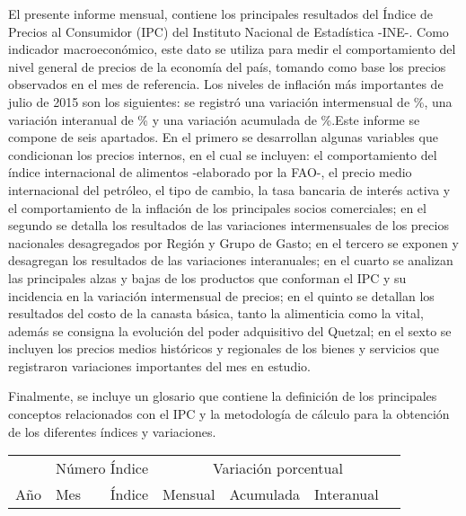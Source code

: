$\ $\\[0.5cm]
\large$\ $\\
El presente informe mensual, contiene los principales resultados del Índice de Precios al Consumidor (IPC) del Instituto Nacional de Estadística -INE-.  Como indicador macroeconómico, este dato se utiliza para medir el comportamiento del nivel general de precios de la economía del país, tomando como base los precios observados en el mes de referencia. 
Los niveles de inflación más importantes de {\Bold julio de 2015 }son los siguientes: se registró una variación intermensual de \varmens\%, una variación interanual de \varanu\% y una variación acumulada de \varacu\%.Este informe se compone de seis apartados. En el primero se desarrollan algunas variables que condicionan los precios internos, en el cual se incluyen: el comportamiento del índice internacional de alimentos -elaborado por la FAO-, el precio medio internacional del petróleo, el tipo de cambio, la tasa bancaria de interés activa y el comportamiento de la inflación de los principales  socios comerciales; en el segundo se detalla los resultados de las variaciones intermensuales de los precios nacionales desagregados por Región y Grupo de Gasto; en el tercero se exponen y desagregan los resultados de las variaciones interanuales; en el cuarto se analizan las principales alzas y bajas  de los productos que conforman el IPC y su incidencia en la variación intermensual de precios; en el quinto se detallan los resultados del costo de la canasta básica, tanto la alimenticia como la vital, además se consigna la evolución del poder adquisitivo del Quetzal; en el sexto se incluyen los precios medios históricos y regionales de los bienes y servicios que registraron variaciones importantes del mes en estudio.


Finalmente, se incluye un glosario que contiene la definición de los principales conceptos relacionados con el IPC y la metodología de cálculo para la obtención de los diferentes índices y variaciones.
$\ $\thispagestyle{empty}


\cleardoublepage 
 

 


{%
 }%
{%
 } %
{%
 } %
{%
 	\begin{tabular}{rlrrrcc}
		&  \multicolumn{2}{c}{Número Índice} \phantom{abc} &   \multicolumn{4}{c}{Variación porcentual}\\
		\cmidrule{2-3} \cmidrule{5-7} 
Año &  Mes &  Índice &   Mensual &  Acumulada&  Interanual\\ \hline 
	\bottomrule
	\end{tabular}
}%
{%
 } %
 
